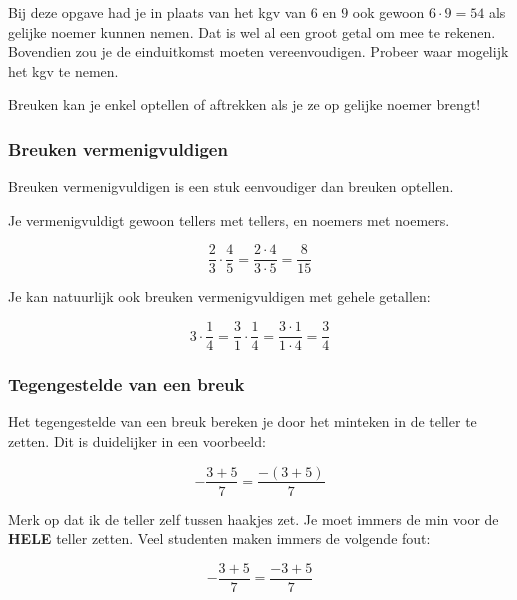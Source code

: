 Bij deze opgave had je in plaats van het kgv van $6$ en $9$ ook gewoon $6\cdot 9=54$ als gelijke noemer kunnen nemen. Dat is wel al een groot getal om mee te rekenen. Bovendien zou je de einduitkomst moeten vereenvoudigen. Probeer waar mogelijk het kgv te nemen.

\begin{ftonthoud}
	Breuken kan je enkel optellen of aftrekken als je ze op gelijke noemer brengt!	
\end{ftonthoud}


\subsubsection{Breuken vermenigvuldigen}

Breuken vermenigvuldigen is een stuk eenvoudiger dan breuken optellen.

\begin{ftrekenregel}
		Je vermenigvuldigt gewoon tellers met tellers, en noemers met noemers.
\end{ftrekenregel}

\begin{equation*}
\frac{2}{3}\cdot \frac{4}{5} = \frac{2 \cdot 4}{3 \cdot 5} = \frac{8}{15}
\end{equation*}

Je kan natuurlijk ook breuken vermenigvuldigen met gehele getallen:

\begin{equation*}
3\cdot \frac{1}{4} = \frac{3}{1} \cdot \frac{1}{4} = \frac{3 \cdot 1}{1 \cdot 4} = \frac{3}{4}
\end{equation*}


\subsubsection{Tegengestelde van een breuk}

Het tegengestelde van een breuk bereken je door het minteken in de teller te zetten. Dit is duidelijker in een voorbeeld:

\begin{equation*}
-\frac{3+5}{7}=\frac{-(3+5)}{7}
\end{equation*}

Merk op dat ik de teller zelf tussen haakjes zet. Je moet immers de min voor de \textbf{HELE} teller zetten. Veel studenten maken immers de volgende fout:

\begin{equation*}
-\frac{3+5}{7}=\frac{-3+5}{7}
\end{equation*}

